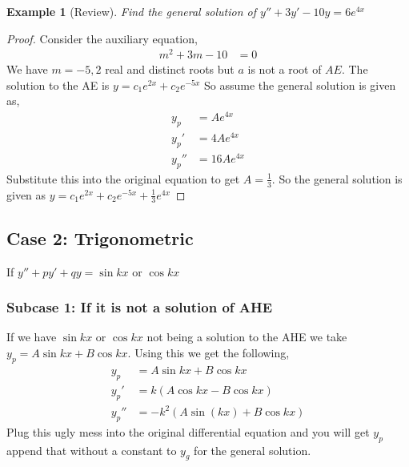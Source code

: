 \documentclass[oneside,11pt,pdftex,final]{book}%
\numberwithin{equation}{section}
\newtheorem{example}[theorem]{Example}
\numberwithin{section}{chapter}
\numberwithin{equation}{chapter}
\begin{document}
\begin{example}[Review]
	Find the general solution of $ y''+3y'-10y=6e^{4x} $
\end{example}
\begin{proof}
	Consider the auxiliary equation,
	\begin{align*}
		m^2+3m-10&=0
	\end{align*}
We have $ m=-5,2 $ real and distinct roots but $ a $ is not a root of $ AE $. The solution to the AE is $ y=c_1e^{2x}+c_2e^{-5x} $
So assume the general solution is given as,
\begin{align*}
	y_p&= Ae^{4x}\\
	y_p'&=4Ae^{4x}\\
	y_p''&=16Ae^{4x}
\end{align*}
Substitute this into the original equation to get $ A=\frac{1}{3} $.
So the general solution is given as $ y=c_1e^{2x}+c_2e^{-5x}+\frac{1}{3}e^{4x} $

\end{proof}

\subsection{Case 2: Trigonometric}
If $ y''+py'+qy=\sin kx $ or $ \cos kx $
\subsubsection{Subcase 1: If it is not a solution of AHE}
If we have $ \sin kx  $  or $ \cos kx  $ not being a solution to the AHE we take $ y_p=A \sin kx + B \cos kx $. Using this we get the following,
\begin{align*}
	y_p&=A \sin kx + B \cos kx\\
	y_p'&=k(A \cos kx - B \cos kx)\\
	y_p''&=-k^2(A \sin (kx)+B \cos kx)
\end{align*}
Plug this ugly mess into the original differential equation and you will get $ y_p $ append that without a constant to $ y_g $ for the general solution.
\end{document}
